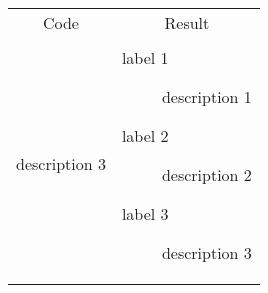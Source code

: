 \begin{tabular}{p{6cm} | p{6cm}}
	\multicolumn{1}{c|}{Code}
	& \multicolumn{1}{c}{Result}
	\\
	
	\begin{lstlisting}[language=tex]
	\begin{description}
		\item[label 1] description 1
		\item[label 2] description 2
		\item[label 3] \mbox{} \\
		description 3
	\end{description}
	\end{lstlisting}
	&
	\begin{description}
		\item[label 1] description 1
		\item[label 2] description 2
		\item[label 3] \mbox{} \newline
		description 3
	\end{description}
	
\end{tabular}
